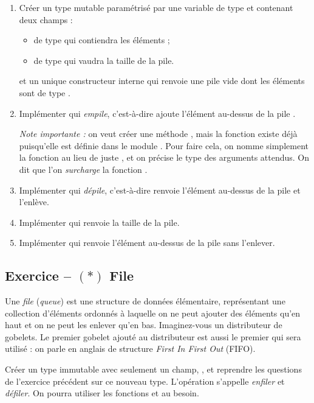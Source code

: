 \documentclass{article}
\newcounter{loop}
\newcounter{numEx}
\newcommand{\exo}[1]{
	\stepcounter{numEx}
	\setcounter{loop}{0}
	\subsection*{Exercice \arabic{numEx} -- #1}
}
\begin{document}
\begin{enumerate}
	\item Créer un type mutable  paramétrisé par une variable de type  et contenant deux champs :
	\begin{itemize}
		\item {} de type  qui contiendra les éléments ;
		\item {} de type  qui vaudra la taille de la pile.
	\end{itemize}
	et un unique constructeur interne  qui renvoie une pile vide dont les éléments sont de type .
	\item Implémenter  qui \emph{empile}, c'est-à-dire ajoute l'élément  au-dessus de la pile .

	\emph{Note importante :} on veut créer une méthode , mais la fonction  existe déjà puisqu'elle est définie dans le module . Pour faire cela, on nomme simplement la fonction  au lieu de juste , et on précise le type des arguments attendus. On dit que l'on \emph{surcharge} la fonction .

	\item Implémenter  qui \emph{dépile}, c'est-à-dire renvoie l'élément au-dessus de la pile et l'enlève.

	\item Implémenter  qui renvoie la taille de la pile.

	\item Implémenter  qui renvoie l'élément au-dessus de la pile sans l'enlever.
\end{enumerate}

\exo{$(*)$ File}

Une \emph{file} (\textit{queue}) est une structure de données élémentaire, représentant une collection d'éléments ordonnés à laquelle on ne peut ajouter des éléments qu'en haut et on ne peut les enlever qu'en bas. Imaginez-vous un distributeur de gobelets. Le premier gobelet ajouté au distributeur est aussi le premier qui sera utilisé : on parle en anglais de structure \textit{First In First Out} (FIFO).

Créer un type immutable  avec seulement un champ, , et reprendre les questions de l'exercice précédent sur ce nouveau type. L'opération  s'appelle \emph{enfiler} et  \emph{défiler}. On pourra utiliser les fonctions  et  au besoin.
\end{document}
